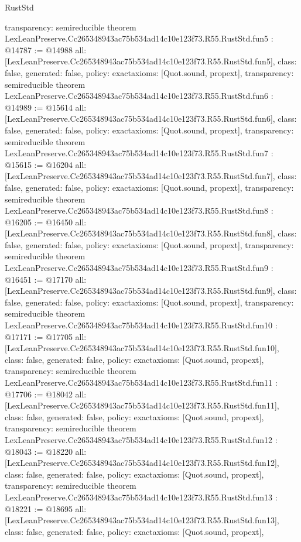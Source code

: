 \begin{lexlean}{RustStd}
\begin{coremodule}
{  transparency: semireducible
}
theorem LexLeanPreserve.Cc265348943ac75b534ad14c10e123f73.R55.RustStd.fun5 : @14787 := @14988 {
  all: [LexLeanPreserve.Cc265348943ac75b534ad14c10e123f73.R55.RustStd.fun5],
  class: false,
  generated: false,
  policy: exact{axioms: [Quot.sound, propext]},
  transparency: semireducible
}
theorem LexLeanPreserve.Cc265348943ac75b534ad14c10e123f73.R55.RustStd.fun6 : @14989 := @15614 {
  all: [LexLeanPreserve.Cc265348943ac75b534ad14c10e123f73.R55.RustStd.fun6],
  class: false,
  generated: false,
  policy: exact{axioms: [Quot.sound, propext]},
  transparency: semireducible
}
theorem LexLeanPreserve.Cc265348943ac75b534ad14c10e123f73.R55.RustStd.fun7 : @15615 := @16204 {
  all: [LexLeanPreserve.Cc265348943ac75b534ad14c10e123f73.R55.RustStd.fun7],
  class: false,
  generated: false,
  policy: exact{axioms: [Quot.sound, propext]},
  transparency: semireducible
}
theorem LexLeanPreserve.Cc265348943ac75b534ad14c10e123f73.R55.RustStd.fun8 : @16205 := @16450 {
  all: [LexLeanPreserve.Cc265348943ac75b534ad14c10e123f73.R55.RustStd.fun8],
  class: false,
  generated: false,
  policy: exact{axioms: [Quot.sound, propext]},
  transparency: semireducible
}
theorem LexLeanPreserve.Cc265348943ac75b534ad14c10e123f73.R55.RustStd.fun9 : @16451 := @17170 {
  all: [LexLeanPreserve.Cc265348943ac75b534ad14c10e123f73.R55.RustStd.fun9],
  class: false,
  generated: false,
  policy: exact{axioms: [Quot.sound, propext]},
  transparency: semireducible
}
theorem LexLeanPreserve.Cc265348943ac75b534ad14c10e123f73.R55.RustStd.fun10 : @17171 := @17705 {
  all: [LexLeanPreserve.Cc265348943ac75b534ad14c10e123f73.R55.RustStd.fun10],
  class: false,
  generated: false,
  policy: exact{axioms: [Quot.sound, propext]},
  transparency: semireducible
}
theorem LexLeanPreserve.Cc265348943ac75b534ad14c10e123f73.R55.RustStd.fun11 : @17706 := @18042 {
  all: [LexLeanPreserve.Cc265348943ac75b534ad14c10e123f73.R55.RustStd.fun11],
  class: false,
  generated: false,
  policy: exact{axioms: [Quot.sound, propext]},
  transparency: semireducible
}
theorem LexLeanPreserve.Cc265348943ac75b534ad14c10e123f73.R55.RustStd.fun12 : @18043 := @18220 {
  all: [LexLeanPreserve.Cc265348943ac75b534ad14c10e123f73.R55.RustStd.fun12],
  class: false,
  generated: false,
  policy: exact{axioms: [Quot.sound, propext]},
  transparency: semireducible
}
theorem LexLeanPreserve.Cc265348943ac75b534ad14c10e123f73.R55.RustStd.fun13 : @18221 := @18695 {
  all: [LexLeanPreserve.Cc265348943ac75b534ad14c10e123f73.R55.RustStd.fun13],
  class: false,
  generated: false,
  policy: exact{axioms: [Quot.sound, propext]},
}
\end{coremodule}
\end{lexlean}
